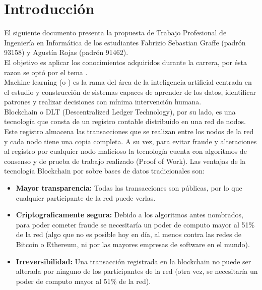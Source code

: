 \documentclass[
11pt, %
oneside, %
spanish, %
singlespacing, %
headsepline, %
chapterinoneline, %
]{MastersDoctoralThesis} %
\begin{document}

\tableofcontents %


\mainmatter %

\pagestyle{thesis} %

\chapter{Introducci\'on}
El siguiente documento presenta la propuesta de Trabajo Profesional de Ingeniería en Informática de los estudiantes Fabrizio Sebastian Graffe (padrón 93158) y Agustín Rojas (padrón 91462). \\

El objetivo es aplicar los conocimientos adquiridos durante la carrera, por ésta razon se optó por el tema \textbf{ }. \\

Machine learning (o ) es la rama del área de la inteligencia artificial centrada en el estudio y construcción de sistemas capaces de aprender de los datos, identificar patrones y realizar decisiones con mínima intervención humana. \\

Blockchain \cite{bc} o DLT (Descentralized Ledger Technology), por su lado, es una tecnología que consta de un registro contable distribuido en una red de nodos. Este registro almacena las transacciones que se realizan entre los nodos de la red y cada nodo tiene una copia completa. A su vez, para evitar fraude y alteraciones al registro por cualquier nodo malicioso la tecnología cuenta con algoritmos de consenso y de prueba de trabajo realizado (Proof of Work).
Las ventajas de la tecnología Blockchain por sobre bases de datos tradicionales son:
\begin{itemize}
\item \textbf{Mayor transparencia:} Todas las transacciones son públicas, por lo que cualquier participante de la red puede verlas.
\item \textbf{Criptograficamente segura:} Debido a los algoritmos antes nombrados, para poder cometer fraude se necesitaría un poder de computo mayor al 51\% de la red (algo que no es posible hoy en día, al menos contra las redes de Bitcoin o Ethereum, ni por las mayores empresas de software en el mundo).
\item \textbf{Irreversibilidad:} Una transacción registrada en la blockchain no puede ser alterada por ninguno de los participantes de la red (otra vez, se necesitaría un poder de computo mayor al 51\% de la red).
\end{itemize}
\end{document}
